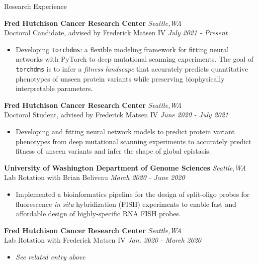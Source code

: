 \documentclass{resume} %
\begin{document}
\begin{rSection}{Research Experience}

{\bf Fred Hutchison Cancer Research Center} \hfill { \em Seattle,WA}\\
{Doctoral Candidate, advised by Frederick Matsen IV} \hfill {\em July 2021 - Present}
\begin{itemize}
    \item Developing \texttt{torchdms}: a flexible modeling framework for fitting neural networks with PyTorch to deep mutational scanning experiments.
    The goal of \texttt{torchdms} is to infer a \emph{fitness landscape} that accurately predicts quantitative phenotypes of unseen protein variants while preserving biophysically interpretable parameters.
\end{itemize}

{\bf Fred Hutchison Cancer Research Center} \hfill { \em Seattle,WA}\\
{Doctoral Student, advised by Frederick Matsen IV} \hfill {\em June 2020 - July 2021}
\begin{itemize}
    \item Developing and fitting neural network models to predict protein variant phenotypes from deep mutational scanning experiments to accurately predict fitness of unseen variants and infer the shape of global epistasis.
\end{itemize}

{\bf University of Washington Department of Genome Sciences} \hfill { \em Seattle,WA}\\
{Lab Rotation with Brian Beliveau} \hfill {\em March 2020 - June 2020}
\begin{itemize}
    \item Implemented a bioinformatics pipeline for the design of split-oligo probes for fluorescence \emph{in situ} hybridization (FISH) experiments to enable fast and affordable design of highly-specific RNA FISH probes.
\end{itemize}

{\bf Fred Hutchison Cancer Research Center} \hfill { \em Seattle,WA}\\
{Lab Rotation with Frederick Matsen IV} \hfill {\em Jan. 2020 - March 2020}
\begin{itemize}
    \item \emph{See related entry above}
\end{itemize}


\end{rSection}
\end{document}
